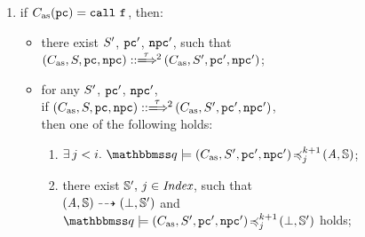 \begin{definition}
\begin{enumerate}[1.]
        \item if {\em $\asmimp(\pc) = \call \ \lab{}$}, then:
            \begin{itemize}
                \item there exist {\em $S'$}, {\em $\texttt{pc}'$}, {\em $\texttt{npc}'$},
                 such that \\
                    {\em $\LGlobMultiTrans{(\asmimp, \state, \pc, \npc)}
                            {\empmsg\,}{2}{(\asmimp, \state', \pc', \npc')}$};
                \item for any {\em $S'$}, {\em $\texttt{pc}'$}, {\em $\texttt{npc}'$}, \\ if
                {\em $\LGlobMultiTrans{(\asmimp, \state, \pc, \npc)}{\empmsg\,}
                        {2}{(\asmimp, \state', \pc', \npc')}$}, \\
                    then one of the following holds:
                \begin{enumerate}
                    \item {\em $\exists \, j < i. \
                        \simFunctionSt{\relastQ}{(\asmimp, \state', \pc', \npc')}
                            {j}{k+1}{(\primcom, \hpstate)}$};
                    \item there exist $\mathbb{S}', \, j \in \textit{Index}$,
                        such that \\
                        ${(\textit{A}, \mathbb{S})} \dashrightarrow {(\perp, \mathbb{S}')}$
                        and \\
                        {\em $\simFunctionSt{\relastQ}{(\asmimp, \state', \pc', \npc')}
                                {j}{k+1}{(\primdone, \hpstate')}$} holds;
                \end{enumerate}
            \end{itemize}
            \vspace{0.5em}


\end{enumerate}
\end{definition}
